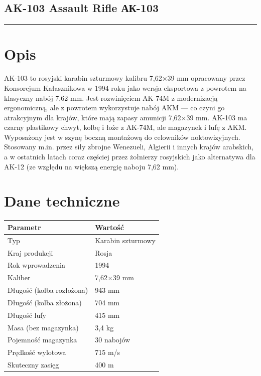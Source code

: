 \documentclass[12pt,openany,oneside]{book}
\begin{document}
\subsection{AK-103 Assault Rifle \textbar{}
АК-103}\label{ak-103-assault-rifle-ux430ux43a-103}

\begin{center}\rule{0.5\linewidth}{0.5pt}\end{center}

\section{Opis}\label{opis-48}

AK-103 to rosyjski karabin szturmowy kalibru 7,62×39 mm opracowany przez
Konsorcjum Kałasznikowa w 1994 roku jako wersja eksportowa z powrotem na
klasyczny nabój 7,62 mm. Jest rozwinięciem AK-74M z modernizacją
ergonomiczną, ale z powrotem wykorzystuje nabój AKM --- co czyni go
atrakcyjnym dla krajów, które mają zapasy amunicji 7,62×39 mm. AK-103 ma
czarny plastikowy chwyt, kolbę i łoże z AK-74M, ale magazynek i lufę z
AKM. Wyposażony jest w szynę boczną montażową do celowników
noktowizyjnych. Stosowany m.in. przez siły zbrojne Wenezueli, Algierii i
innych krajów arabskich, a w ostatnich latach coraz częściej przez
żołnierzy rosyjskich jako alternatywa dla AK-12 (ze względu na większą
energię naboju 7,62 mm).

\section{Dane techniczne}\label{dane-techniczne-48}

\begin{longtable}[]{@{}ll@{}}
\toprule\noalign{}
Parametr & Wartość \\
\midrule\noalign{}
\endhead
\bottomrule\noalign{}
\endlastfoot
Typ & Karabin szturmowy \\
Kraj produkcji & Rosja \\
Rok wprowadzenia & 1994 \\
Kaliber & 7,62×39 mm \\
Długość (kolba rozłożona) & 943 mm \\
Długość (kolba złożona) & 704 mm \\
Długość lufy & 415 mm \\
Masa (bez magazynka) & 3,4 kg \\
Pojemność magazynka & 30 nabojów \\
Prędkość wylotowa & 715 m/s \\
Skuteczny zasięg & 400 m \\
\end{longtable}
\end{document}
